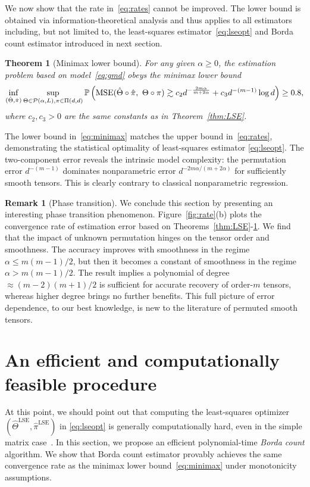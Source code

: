 \documentclass[11pt]{article}
\newtheorem{thm}{Theorem}
\theoremstyle{definition}
\newtheorem{rmk}{Remark}
\begin{document}
We now show that the rate in~\eqref{eq:rates} cannot be improved. The lower bound is obtained via information-theoretical analysis and thus applies to all estimators including, but not limited to, the least-squares estimator~\eqref{eq:lseopt} and Borda count estimator introduced in next section. 
\begin{thm}[Minimax lower bound]\label{thm:minimax}For any given $\alpha\geq 0$, the estimation problem based on model~\eqref{eq:gmd} obeys the minimax lower bound 
\begin{equation}\label{eq:minimax}
\inf_{(\hat \Theta,\hat \pi)}\sup_{
\Theta\in \mathcal{P}(\alpha,L), \pi\in \Pi(d,d)} \mathbb{P}\left(\textup{MSE}(\hat\Theta\circ\hat\pi,\ \Theta\circ\pi) \gtrsim c_2 d^{-{2m\alpha\over m+2\alpha}}+c_3 d^{-(m-1)}\log d \right) \geq 0.8,
\end{equation}
where $c_2,c_3>0$ are the same constants as in Theorem~\ref{thm:LSE}. 
\end{thm}
The lower bound in~\eqref{eq:minimax} matches the upper bound in~\eqref{eq:rates}, demonstrating the statistical optimality of  least-squares estimator \eqref{eq:lseopt}. The two-component error reveals the intrinsic model complexity: the permutation error $d^{-(m-1)}$ dominates nonparametric error $d^{-{2m\alpha/(m+2\alpha)}}$ for sufficiently smooth tensors. This is clearly contrary to classical nonparametric regression. 

\begin{rmk}[Phase transition]\label{rmk:phase} We conclude this section by presenting an interesting phase transition phenomenon.  Figure~\ref{fig:rate}(b) plots the convergence rate of estimation error based on Theorems~\ref{thm:LSE}-\ref{thm:minimax}. We find that the impact of unknown permutation hinges on the tensor order and smoothness.  
The accuracy improves with smoothness in the regime $\alpha\leq m(m-1)/2$, but then it becomes a constant of smoothness in the regime $\alpha>m(m-1)/2$. 
The result implies a polynomial of degree $\approx (m-2)(m+1)/2$ is sufficient for accurate recovery of order-$m$ tensors, whereas higher degree brings no further benefits. This full picture of error dependence, to our best knowledge, is new to the literature of permuted smooth tensors.
\end{rmk}


\section{An efficient and computationally feasible procedure}\label{sec:borda}
At this point, we should point out that computing the least-squares optimizer $(\hat\Theta^{\text{LSE}},\hat\pi^{\text{LSE}})$ in \eqref{eq:lseopt} is generally computationally hard, even in the simple matrix case~\citep{gao2015rate}. In this section, we propose an efficient polynomial-time \emph{Borda count} algorithm. We show that Borda count estimator provably achieves the same convergence rate as the minimax lower bound~\eqref{eq:minimax} under monotonicity assumptions. 
\end{document}
